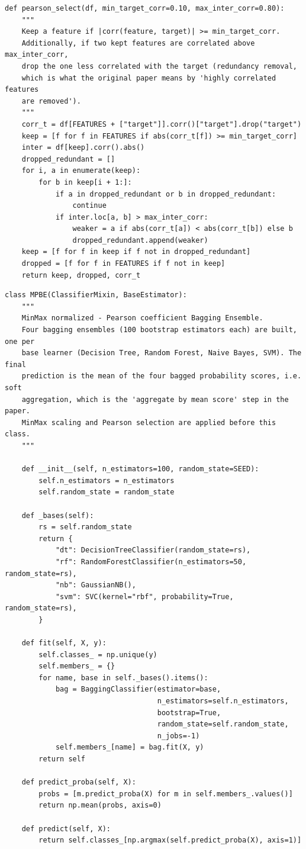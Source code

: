 \documentclass[12pt,a4paper,oneside]{report}
\begin{document}
\begin{lstlisting}[caption={Pearson correlation feature selection},]
def pearson_select(df, min_target_corr=0.10, max_inter_corr=0.80):
    """
    Keep a feature if |corr(feature, target)| >= min_target_corr.
    Additionally, if two kept features are correlated above max_inter_corr,
    drop the one less correlated with the target (redundancy removal,
    which is what the original paper means by 'highly correlated features
    are removed').
    """
    corr_t = df[FEATURES + ["target"]].corr()["target"].drop("target")
    keep = [f for f in FEATURES if abs(corr_t[f]) >= min_target_corr]
    inter = df[keep].corr().abs()
    dropped_redundant = []
    for i, a in enumerate(keep):
        for b in keep[i + 1:]:
            if a in dropped_redundant or b in dropped_redundant:
                continue
            if inter.loc[a, b] > max_inter_corr:
                weaker = a if abs(corr_t[a]) < abs(corr_t[b]) else b
                dropped_redundant.append(weaker)
    keep = [f for f in keep if f not in dropped_redundant]
    dropped = [f for f in FEATURES if f not in keep]
    return keep, dropped, corr_t
\end{lstlisting}

\begin{lstlisting}[caption={The MPBE ensemble class},]
class MPBE(ClassifierMixin, BaseEstimator):
    """
    MinMax normalized - Pearson coefficient Bagging Ensemble.
    Four bagging ensembles (100 bootstrap estimators each) are built, one per
    base learner (Decision Tree, Random Forest, Naive Bayes, SVM). The final
    prediction is the mean of the four bagged probability scores, i.e. soft
    aggregation, which is the 'aggregate by mean score' step in the paper.
    MinMax scaling and Pearson selection are applied before this class.
    """

    def __init__(self, n_estimators=100, random_state=SEED):
        self.n_estimators = n_estimators
        self.random_state = random_state

    def _bases(self):
        rs = self.random_state
        return {
            "dt": DecisionTreeClassifier(random_state=rs),
            "rf": RandomForestClassifier(n_estimators=50, random_state=rs),
            "nb": GaussianNB(),
            "svm": SVC(kernel="rbf", probability=True, random_state=rs),
        }

    def fit(self, X, y):
        self.classes_ = np.unique(y)
        self.members_ = {}
        for name, base in self._bases().items():
            bag = BaggingClassifier(estimator=base,
                                    n_estimators=self.n_estimators,
                                    bootstrap=True,
                                    random_state=self.random_state,
                                    n_jobs=-1)
            self.members_[name] = bag.fit(X, y)
        return self

    def predict_proba(self, X):
        probs = [m.predict_proba(X) for m in self.members_.values()]
        return np.mean(probs, axis=0)

    def predict(self, X):
        return self.classes_[np.argmax(self.predict_proba(X), axis=1)]
\end{lstlisting}
\end{document}
